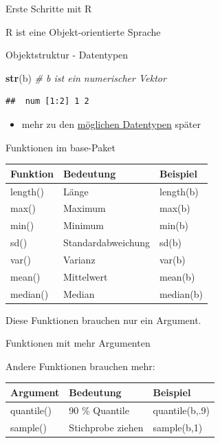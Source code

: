 \documentclass[ignorenonframetext,]{beamer}
\newenvironment{Shaded}{}{}
\newcommand{\KeywordTok}[1]{\textcolor[rgb]{0.00,0.44,0.13}{\textbf{{#1}}}}
\newcommand{\CommentTok}[1]{\textcolor[rgb]{0.38,0.63,0.69}{\textit{{#1}}}}
\newcommand{\NormalTok}[1]{{#1}}
\providecommand{\tightlist}{%
\setlength{\itemsep}{0pt}\setlength{\parskip}{0pt}}
\begin{document}
\begin{frame}[fragile]{Erste Schritte mit R}
\begin{block}{R ist eine Objekt-orientierte Sprache}
\end{block}

\begin{block}{Objektstruktur - Datentypen}

\begin{Shaded}
\begin{Highlighting}[]
\KeywordTok{str}\NormalTok{(b) }\CommentTok{# b ist ein numerischer Vektor}
\end{Highlighting}
\end{Shaded}

\begin{verbatim}
##  num [1:2] 1 2
\end{verbatim}

\begin{itemize}
\tightlist
\item
  mehr zu den
  \href{http://www.statmethods.net/management/typeconversion.html}{möglichen
  Datentypen} später
\end{itemize}

\end{block}

\begin{block}{Funktionen im base-Paket}

\begin{longtable}[]{@{}lll@{}}
\toprule
Funktion & Bedeutung & Beispiel\tabularnewline
\midrule
\endhead
length() & Länge & length(b)\tabularnewline
max() & Maximum & max(b)\tabularnewline
min() & Minimum & min(b)\tabularnewline
sd() & Standardabweichung & sd(b)\tabularnewline
var() & Varianz & var(b)\tabularnewline
mean() & Mittelwert & mean(b)\tabularnewline
median() & Median & median(b)\tabularnewline
\bottomrule
\end{longtable}

Diese Funktionen brauchen nur ein Argument.

\end{block}

\begin{block}{Funktionen mit mehr Argumenten}

Andere Funktionen brauchen mehr:

\begin{longtable}[]{@{}lll@{}}
\toprule
Argument & Bedeutung & Beispiel\tabularnewline
\midrule
\endhead
quantile() & 90 \% Quantile & quantile(b,.9)\tabularnewline
sample() & Stichprobe ziehen & sample(b,1)\tabularnewline
\bottomrule
\end{longtable}

\end{block}


\end{frame}
\end{document}
